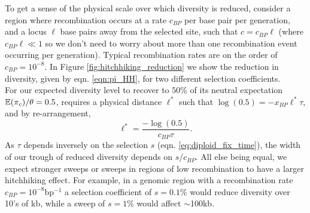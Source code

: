 To get a sense of the physical scale over which diversity is reduced,
consider a region where recombination occurs at a rate $c_{BP}$ per
base pair per generation, and a locus $ \ell $ base pairs away from the
selected site, such that $c=c_{BP } \ell $ (where $c_{BP}  \ell  \ll 1$ so we don't need to
worry about more than one recombination event occurring per
generation). Typical
recombination rates are on the order of $c_{BP} = 10^{-8}$. In Figure
\ref{fig:hitchhiking_reduction} we show the reduction in diversity,
given by eqn. \eqref{eqn:pi_HH}, for two different selection coefficients.\\ 

For our expected diversity level to recover to $50\%$ of
its neutral expectation $\mathbb{E}(\pi_c)/\theta=0.5$, requires a physical
distance $\ell^{*}$ such that $\log(0.5) = -x_{BP} \ell ^*\tau$, and by re-arrangement,
\begin{equation}
\ell^* = \frac{-\log(0.5)}{c_{BP} \tau }.
\end{equation}
As
$\tau$ depends inversely on the selection $s$ (eqn. \eqref{eq:diploid_fix_time}), the width of our trough of reduced diversity depends on $s/c_{BP}$.
All else being equal, we expect stronger sweeps or sweeps in regions of low
recombination to have a larger hitchhiking effect. For example, in a genomic region with a recombination rate $c_{BP}=10^{-8}$bp$^{-1}$ a selection coefficient of $s=0.1\%$ would reduce
diversity over 10's of kb, while a sweep of $s=1\%$ would affect
$\sim$100kb.   \\



